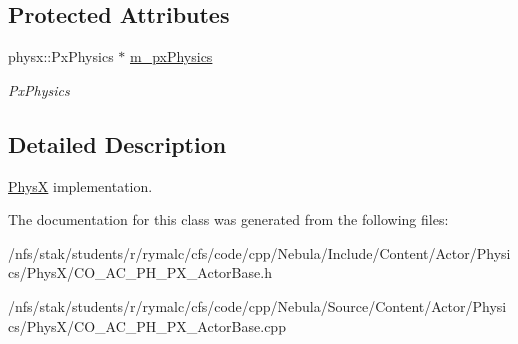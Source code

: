 \subsection*{Protected Attributes}
\begin{DoxyCompactItemize}
\item 
\hypertarget{classContent_1_1Actor_1_1Physics_1_1PhysX_1_1ActorBase_a573638092375246178489021a4f1e94d}{
physx::PxPhysics $\ast$ \hyperlink{classContent_1_1Actor_1_1Physics_1_1PhysX_1_1ActorBase_a573638092375246178489021a4f1e94d}{m\_\-pxPhysics}}
\label{classContent_1_1Actor_1_1Physics_1_1PhysX_1_1ActorBase_a573638092375246178489021a4f1e94d}

\begin{DoxyCompactList}\small\item\em PxPhysics \item\end{DoxyCompactList}\end{DoxyCompactItemize}


\subsection{Detailed Description}
\hyperlink{namespaceContent_1_1Actor_1_1Physics_1_1PhysX}{PhysX} implementation. 

The documentation for this class was generated from the following files:\begin{DoxyCompactItemize}
\item 
/nfs/stak/students/r/rymalc/cfs/code/cpp/Nebula/Include/Content/Actor/Physics/PhysX/CO\_\-AC\_\-PH\_\-PX\_\-ActorBase.h\item 
/nfs/stak/students/r/rymalc/cfs/code/cpp/Nebula/Source/Content/Actor/Physics/PhysX/CO\_\-AC\_\-PH\_\-PX\_\-ActorBase.cpp\end{DoxyCompactItemize}

